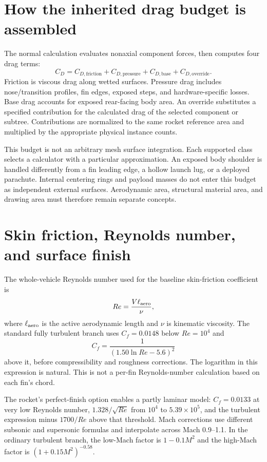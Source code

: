 \section{How the inherited drag budget is assembled}\label{sec:drag-budget}
The normal calculation evaluates nonaxial component forces, then computes four drag terms:
\begin{equation}
C_D=C_{D,\mathrm{friction}}+C_{D,\mathrm{pressure}}+
C_{D,\mathrm{base}}+C_{D,\mathrm{override}}.
\end{equation}
Friction is viscous drag along wetted surfaces. Pressure drag includes nose/transition profiles, fin edges, exposed steps, and hardware-specific losses. Base drag accounts for exposed rear-facing body area. An override substitutes a specified contribution for the calculated drag of the selected component or subtree. Contributions are normalized to the same rocket reference area and multiplied by the appropriate physical instance counts.

This budget is not an arbitrary mesh surface integration. Each supported class selects a calculator with a particular approximation. An exposed body shoulder is handled differently from a fin leading edge, a hollow launch lug, or a deployed parachute. Internal centering rings and payload masses do not enter this budget as independent external surfaces. Aerodynamic area, structural material area, and drawing area must therefore remain separate concepts.

\section{Skin friction, Reynolds number, and surface finish}
The whole-vehicle Reynolds number used for the baseline skin-friction coefficient is
\begin{equation}
Re=\frac{V\ell_{\rm aero}}{\nu},
\end{equation}
where $\ell_{\rm aero}$ is the active aerodynamic length and $\nu$ is kinematic viscosity. The standard fully turbulent branch uses $C_f=0.0148$ below $Re=10^4$ and
\begin{equation}
C_f=\frac{1}{(1.50\ln Re-5.6)^2}
\end{equation}
above it, before compressibility and roughness corrections. The logarithm in this expression is natural. This is not a per-fin Reynolds-number calculation based on each fin's chord.

The rocket's perfect-finish option enables a partly laminar model: $C_f=0.0133$ at very low Reynolds number, $1.328/\sqrt{Re}$ from $10^4$ to $5.39\times10^5$, and the turbulent expression minus $1700/Re$ above that threshold. Mach corrections use different subsonic and supersonic formulas and interpolate across Mach 0.9--1.1. In the ordinary turbulent branch, the low-Mach factor is $1-0.1M^2$ and the high-Mach factor is $(1+0.15M^2)^{-0.58}$.

